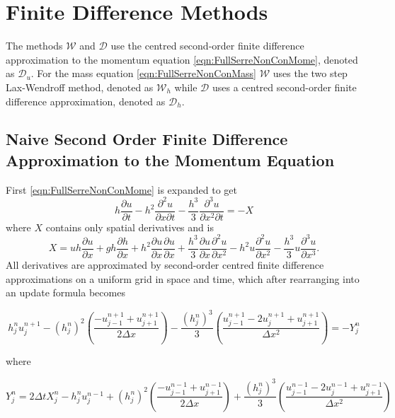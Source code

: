 
\chapter{Finite Difference Methods}
\label{chp:NumMethod}


The methods $\mathcal{W}$ and $\mathcal{D}$ use the centred second-order finite difference approximation to the momentum equation \eqref{eqn:FullSerreNonConMome}, denoted as $\mathcal{D}_u$. For the mass equation \eqref{eqn:FullSerreNonConMass} $\mathcal{W}$ uses the two step Lax-Wendroff method, denoted as $\mathcal{W}_h$ while $\mathcal{D}$ uses a centred second-order finite difference approximation, denoted as $\mathcal{D}_h$.

\section{Naive Second Order Finite Difference Approximation to the Momentum Equation}
First \eqref{eqn:FullSerreNonConMome} is expanded to get
\begin{equation*}
h\dfrac{\partial u}{\partial t} - h^2\frac{\partial^2 u}{\partial x \partial t} - \frac{h^3}{3}\frac{\partial^3 u}{\partial x^2 \partial t}  = -X 
\label{eq:expandedu}
\end{equation*}
where $X$ contains only spatial derivatives and is
\begin{equation*}
X = uh\frac{\partial u}{\partial x} + gh\frac{\partial h}{\partial x} + h^2\frac{\partial u}{\partial x}\frac{\partial u}{\partial x} + \frac{h^3}{3}\frac{\partial u}{\partial x}\frac{\partial^2 u}{\partial x^2} - h^2u\frac{\partial^2 u}{\partial x^2}- \frac{h^3}{3}u\frac{\partial^3 u}{\partial x^3} .
\end{equation*}
All derivatives are approximated by second-order centred finite difference approximations on a uniform grid in space and time, which after rearranging into an update formula becomes

\begin{equation}
h^{n}_ju^{n+1}_j - \left(h^{n}_j\right)^2 \left(\frac{-u^{n+1}_{j-1}+u^{n+1}_{j+1} }{2 \Delta x}\right) - \frac{\left(h^{n}_j\right)^3}{3}\left(\frac{u^{n+1}_{j-1} - 2u^{n+1}_{j}  +u^{n+1}_{j+1} }{\Delta x^2}\right) = - Y^n_j
\label{eq:expandedutdisc3}
\end{equation}

where

\begin{equation*}
Y_j^n = 2\Delta tX_j^{n} - h_j^{n}u_j^{n-1} + \left(h_j^{n}\right)^2\left(\frac{-u^{n-1}_{j-1}+u^{n-1}_{j+1}  }{2 \Delta x}\right) + \frac{\left(h_j^{n}\right)^3}{3}\left(\frac{u^{n-1}_{j-1} - 2u^{n-1}_{j} + u^{n-1}_{j+1} }{\Delta x^2}\right)
\label{eq:expandfactor Xp}
\end{equation*}

